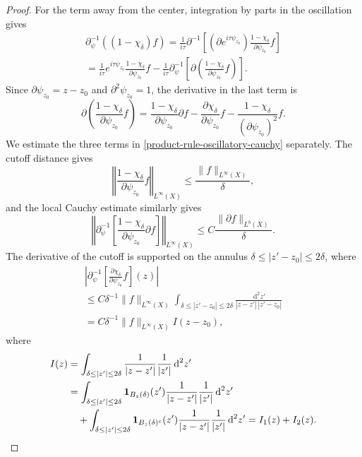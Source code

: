 \documentclass[10pt,a4paper]{amsart}
\newcommand{\dd}{\,\text{d}}
\newcommand{\pr}{\partial}
\newcommand{\psiz}{\psi_{z_0}}
\theoremstyle{plain}
\theoremstyle{definition}
\theoremstyle{remark}
\begin{document}
\begin{proof}
For the term away from the center, integration by parts in the oscillation gives
\begin{multline}
\pr_\psi^{-1}\left((1-\chi_\delta)f\right)
=\frac{1}{i\tau}\pr^{-1}\left[(\pr e^{i\tau\psiz}) \frac{1-\chi_\delta}{\pr\psiz} f  \right]\\[5pt]
=\frac{1}{i\tau}e^{i\tau\psiz}\frac{1-\chi_\delta}{\pr\psiz} f
-\frac{1}{i\tau}\pr_\psi^{-1}\left[\pr\left(\frac{1-\chi_\delta}{\pr\psiz} f\right)\right].
\end{multline}
Since $\partial\psi_{z_0}=z-z_0$ and $\partial^2\psi_{z_0}=1$, the derivative in the last term is
\begin{equation}\label{product-rule-oscillatory-cauchy}
\partial\left(\frac{1-\chi_\delta}{\partial\psi_{z_0}}f\right)
=\frac{1-\chi_\delta}{\partial\psi_{z_0}}\partial f
-\frac{\partial\chi_\delta}{\partial\psi_{z_0}}f
-\frac{1-\chi_\delta}{(\partial\psi_{z_0})^2}f .
\end{equation}
We estimate the three terms in \eqref{product-rule-oscillatory-cauchy} separately.  The cutoff distance gives
\begin{equation}
\left\Vert \frac{1-\chi_\delta}{\pr\psiz} f\right\Vert_{L^\infty(X)}\leq\frac{\|f\|_{L^\infty(X)}}{\delta},
\end{equation}
and the local Cauchy estimate similarly gives
\begin{equation}
\left\Vert\pr_\psi^{-1}\left[\frac{1-\chi_\delta}{\pr\psiz} \pr f  \right]\right\Vert_{L^\infty(X)}\leq C\frac{\|\pr f\|_{L^b(X)}}{\delta}.
\end{equation}
The derivative of the cutoff is supported on the annulus $\delta\leq |z'-z_0|\leq2\delta$, where
\begin{multline}
\left|\pr_\psi^{-1}\left[\frac{\pr \chi_\delta}{\pr\psiz} f  \right](z)\right| \\
\leq C\delta^{-1}\|f\|_{L^\infty(X)}
\int_{\delta\leq|z'-z_0|\leq2\delta}
\frac{\dd^2z'}{|z-z'|\,|z'-z_0|}\\[5pt]
= C\delta^{-1}\|f\|_{L^\infty(X)}I(z-z_0),
\end{multline}
where
\begin{align}
I(z)
&=\int_{\delta\leq|z'|\leq2\delta}\frac{1}{|z-z'|}\frac{1}{|z'|}\dd^2z' \notag\\
&=\int_{\delta\leq|z'|\leq2\delta}\mathbf{1}_{B_{z}(\delta)}(z')\frac{1}{|z-z'|}\frac{1}{|z'|}\dd^2z' \notag\\
&\quad +\int_{\delta\leq|z'|\leq2\delta}\mathbf{1}_{B_{z}(\delta)^c}(z')\frac{1}{|z-z'|}\frac{1}{|z'|}\dd^2z'
=I_1(z)+I_2(z).

\end{align}
\end{proof}
\end{document}
